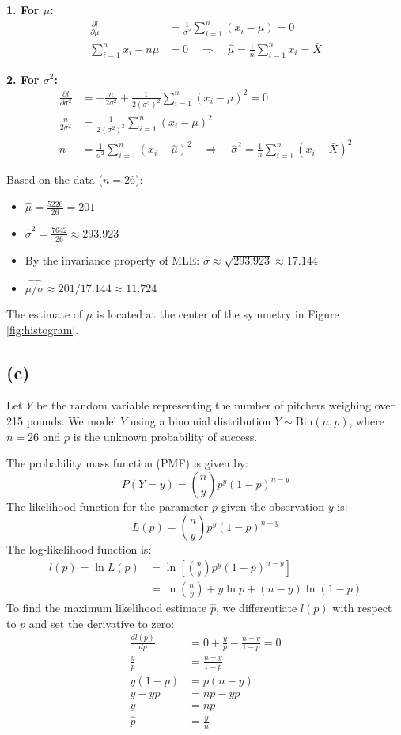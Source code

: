 \documentclass{article}
\begin{document}
\textbf{1. For $\mu$:}
\begin{align*}
\frac{\partial l}{\partial \mu} &= \frac{1}{\sigma^2}\sum_{i=1}^n (x_i-\mu) = 0 \\
\sum_{i=1}^n x_i - n\mu &= 0 \quad \Rightarrow \quad \hat{\mu} = \frac{1}{n}\sum_{i=1}^n x_i = \bar{X}
\end{align*}

\textbf{2. For $\sigma^2$:}
\begin{align*}
\frac{\partial l}{\partial \sigma^2} &= -\frac{n}{2\sigma^2} + \frac{1}{2(\sigma^2)^2}\sum_{i=1}^n (x_i-\mu)^2 = 0 \\
\frac{n}{2\sigma^2} &= \frac{1}{2(\sigma^2)^2}\sum_{i=1}^n (x_i-\mu)^2 \\
n &= \frac{1}{\sigma^2}\sum_{i=1}^n (x_i-\hat{\mu})^2 \quad \Rightarrow \quad \hat{\sigma}^2 = \frac{1}{n}\sum_{i=1}^n (x_i-\bar{X})^2
\end{align*}

Based on the data ($n=26$):
\begin{itemize}
    \item $\hat{\mu} = \frac{5226}{26} =201$
    \item $\hat{\sigma}^2 = \frac{7642}{26} \approx 293.923$
    \item By the invariance property of MLE: $\hat{\sigma} \approx \sqrt{293.923} \approx 17.144$
    \item $\widehat{\mu/\sigma} \approx 201 / 17.144 \approx 11.724$
\end{itemize}
The estimate of $\mu$ is located at the center of the symmetry in Figure \ref{fig:histogram}.

\subsection*{(c)}

Let $Y$ be the random variable representing the number of pitchers weighing 
over 215 pounds. We model $Y$ using a binomial distribution 
$Y \sim \text{Bin}(n, p)$, where $n=26$ and $p$ is the unknown probability 
of success.

\noindent
The probability mass function (PMF) is given by:
\[
P(Y=y) = \binom{n}{y} p^y (1-p)^{n-y}
\]
The likelihood function for the parameter $p$ given the observation $y$ is:
\[
L(p) = \binom{n}{y} p^y (1-p)^{n-y}
\]
The log-likelihood function is:
\begin{align*}
l(p) = \ln L(p) &= \ln \left[ \binom{n}{y} p^y (1-p)^{n-y} \right] \\
&= \ln \binom{n}{y} + y \ln p + (n-y) \ln(1-p)
\end{align*}
To find the maximum likelihood estimate $\hat{p}$, we differentiate $l(p)$ with respect to $p$ and set the derivative to zero:
\begin{align*}
\frac{d l(p)}{d p} &= 0 + \frac{y}{p} - \frac{n-y}{1-p} = 0 \\
\frac{y}{p} &= \frac{n-y}{1-p} \\
y(1-p) &= p(n-y) \\
y - yp &= np - yp \\
y &= np \\
\hat{p} &= \frac{y}{n}
\end{align*}
\end{document}
